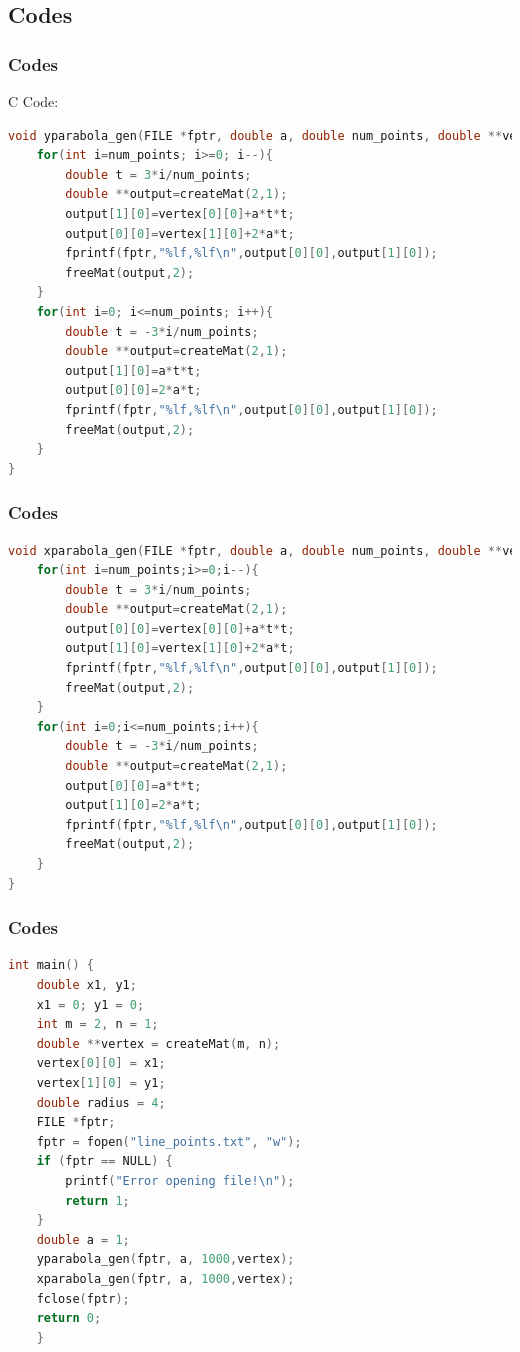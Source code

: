 \documentclass{beamer}
\theoremstyle{remark}
\numberwithin{equation}{section}
\begin{document}
		\subsection{Codes}
		\begin{frame}[fragile]
			\frametitle{Codes}
			C Code:
			\begin{lstlisting}[language=C, basicstyle=\scriptsize]
void yparabola_gen(FILE *fptr, double a, double num_points, double **vertex){
	for(int i=num_points; i>=0; i--){
		double t = 3*i/num_points;
		double **output=createMat(2,1);
		output[1][0]=vertex[0][0]+a*t*t;
		output[0][0]=vertex[1][0]+2*a*t;
		fprintf(fptr,"%lf,%lf\n",output[0][0],output[1][0]);
		freeMat(output,2);
	}
	for(int i=0; i<=num_points; i++){
		double t = -3*i/num_points;
		double **output=createMat(2,1);
		output[1][0]=a*t*t;
		output[0][0]=2*a*t;
		fprintf(fptr,"%lf,%lf\n",output[0][0],output[1][0]);
		freeMat(output,2);
	}
}
			\end{lstlisting}
		\end{frame}
		\begin{frame}[fragile]
			\frametitle{Codes}
			\begin{lstlisting}[language=C, basicstyle=\scriptsize]
void xparabola_gen(FILE *fptr, double a, double num_points, double **vertex){
	for(int i=num_points;i>=0;i--){
		double t = 3*i/num_points;
		double **output=createMat(2,1);
		output[0][0]=vertex[0][0]+a*t*t;
		output[1][0]=vertex[1][0]+2*a*t;
		fprintf(fptr,"%lf,%lf\n",output[0][0],output[1][0]);
		freeMat(output,2);
	}
	for(int i=0;i<=num_points;i++){
		double t = -3*i/num_points;
		double **output=createMat(2,1);
		output[0][0]=a*t*t;
		output[1][0]=2*a*t;
		fprintf(fptr,"%lf,%lf\n",output[0][0],output[1][0]);
		freeMat(output,2);
	}
}
			\end{lstlisting}
		\end{frame}
		\begin{frame}[fragile]
			\frametitle{Codes}
			\begin{lstlisting}[language=C, basicstyle=\scriptsize]
int main() {
	double x1, y1;
	x1 = 0; y1 = 0;
	int m = 2, n = 1;
	double **vertex = createMat(m, n);
	vertex[0][0] = x1;
	vertex[1][0] = y1;
	double radius = 4;
	FILE *fptr;
	fptr = fopen("line_points.txt", "w");
	if (fptr == NULL) {
		printf("Error opening file!\n");
		return 1;
	}
	double a = 1;
	yparabola_gen(fptr, a, 1000,vertex);
	xparabola_gen(fptr, a, 1000,vertex);
	fclose(fptr);
	return 0;
	}
			\end{lstlisting}
		\end{frame}
\end{document}

